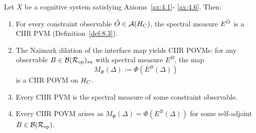 \begin{theorem}
\label{thm:8.1}
Let $X$ be a cognitive system satisfying Axioms~\textup{\ref{ax:4.1}}-%
\textup{\ref{ax:4.6}}.  Then:
\begin{enumerate}
  \item[\textup{(i)}] For every constraint observable
    $\hat{O} \in \mathcal{A}(H_C)$, the spectral measure $E^{\hat{O}}$ is a
    CIIR PVM \textup{(}Definition~\textup{\ref{def:8.3})}.
  \item[\textup{(ii)}] The Naimark dilation of the interface map yields
    CIIR POVMs: for any observable $B \in \mathcal{B}(\mathcal{R}_{\mathrm{op}})_{sa}$
    with spectral measure $E^B$, the map
    \[
      M_\Phi(\Delta) := \Phi(E^B(\Delta))
    \]
    is a CIIR POVM on $H_C$.
  \item[\textup{(iii)}] Every CIIR PVM is the spectral measure of some
    constraint observable.
  \item[\textup{(iv)}] Every CIIR POVM arises as
    $M_\Phi(\Delta) = \Phi(E^B(\Delta))$ for some self-adjoint
    $B \in \mathcal{B}(\mathcal{R}_{\mathrm{op}})$.
\end{enumerate}
\end{theorem}


